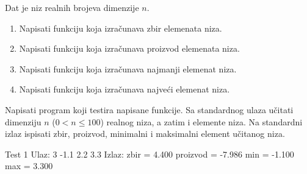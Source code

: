 \begin{Exercise}[label=302]
Dat je niz realnih brojeva dimenzije $n$. 
\begin{enumerate}
\item Napisati funkciju  koja izračunava zbir elemenata niza.
\item Napisati funkciju  koja izračunava proizvod elemenata niza.
\item Napisati funkciju   koja izračunava najmanji elemenat niza.
\item Napisati funkciju   koja izračunava najveći elemenat niza.
\end{enumerate}
Napisati program koji testira napisane funkcije. Sa standardnog ulaza 
učitati dimenziju $n$ ($0 < n \leq 100$) realnog niza, a zatim i 
elemente niza. Na standardni izlaz ispisati zbir, proizvod, 
minimalni i maksimalni element učitanog niza.

\begin{miditest}
\begin{test}{Test 1}
Ulaz: 3 
      -1.1 2.2 3.3 
Izlaz: zbir = 4.400
       proizvod = -7.986
       min = -1.100
       max = 3.300
\end{test}
\end{miditest} 

\end{Exercise}
\begin{Answer}[ref=302]
\end{Answer}

